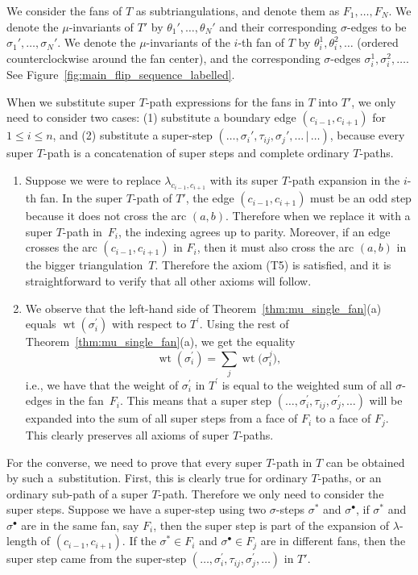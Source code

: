 \documentclass[11pt]{article}
\numberwithin{equation}{section}
\numberwithin{equation}{section}
\DeclareMathOperator{\wt}{wt}
\begin{document}
We consider the fans of $T$ as subtriangulations, and denote them as $F_1,\dots,F_N$.
We denote the $\mu$-invariants of $T'$ by $\theta_1',\dots,\theta_N'$ and their corresponding $\sigma$-edges to be $\sigma_1',\dots,\sigma_N'$.
We denote the $\mu$-invariants of the $i$-th fan of $T$ by $\theta_i^1,\theta_i^2,\dots$ (ordered counterclockwise around the fan center),
and the corresponding $\sigma$-edges $\sigma_i^1,\sigma_i^2,\dots$. See Figure~\ref{fig:main_flip_sequence_labelled}.

When we substitute super $T$-path expressions for the fans in $T$ into $T'$, we only need to consider two cases:
(1) substitute a boundary edge $(c_{i-1},c_{i+1})$ for $1\leqslant i\leqslant n$,
and (2) substitute a super-step $(\dots,\sigma_i',\tau_{ij},\sigma_j',\dots\,|\,\dots)$,
because every super $T$-path is a concatenation of super steps and complete ordinary $T$-paths.

\begin{enumerate} \itemsep=0pt
 \item[(1)] Suppose we were to replace $\lambda_{c_{i-1},c_{i+1}}$ with its super $T$-path expansion in the $i$-th fan.
 In the super $T$-path of $T'$, the edge $(c_{i-1},c_{i+1})$ must be an odd step because it does not cross the arc $(a,b)$.
 Therefore when we replace it with a super $T$-path in~$F_i$, the indexing agrees up to parity.
Moreover, if an edge crosses the arc $(c_{i-1},c_{i+1})$ in $F_i$, then it must also cross the arc $(a,b)$ in the bigger triangulation~$T$.
 Therefore the axiom (T5) is satisfied, and it is straightforward to verify that all other axioms will follow.

 \item[(2)] We observe that the left-hand side of Theorem~\ref{thm:mu_single_fan}(a)
 equals $\wt(\sigma_i^\prime)$ with respect to $T^\prime$. Using the rest of Theorem~\ref{thm:mu_single_fan}(a), we get the equality
 \[\wt(\sigma_i^\prime)=\sum_{j}\wt\big(\sigma_i^j\big),\]
 i.e., we have that the weight of $\sigma_i^\prime$ in $T^\prime$ is equal to the weighted sum of all $\sigma$-edges in the fan~$F_i$.
 This means that a super step $(\dots,\sigma_i^\prime,\tau_{ij},\sigma_j^\prime,\dots)$ will be expanded into the sum of all
 super steps from a face of $F_i$ to a face of $F_j$. This clearly preserves all axioms of super $T$-paths.
\end{enumerate}

For the converse, we need to prove that every super $T$-path in $T$ can be obtained by such a~substitution.
First, this is clearly true for ordinary $T$-paths, or an ordinary sub-path of a super $T$-path. Therefore we only need to consider the super steps.
Suppose we have a super-step using two $\sigma$-steps $\sigma^*$ and $\sigma^\bullet$, if $\sigma^*$ and $\sigma^\bullet$ are in the same fan,
say $F_i$, then the super step is part of the expansion of $\lambda$-length of $(c_{i-1},c_{i+1})$.
If the $\sigma^*\in F_i$ and $\sigma^\bullet\in F_j$ are in different fans, then the super step came from the super-step
$(\dots,\sigma_i^\prime,\tau_{ij},\sigma_j^\prime,\dots)$ in $T'$.
\end{document}
